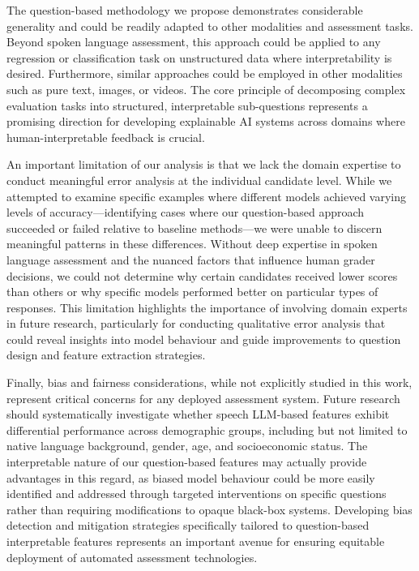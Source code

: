 \documentclass{report}
\begin{document}
The question-based methodology we propose demonstrates considerable generality and could be readily adapted to other modalities and assessment tasks. Beyond spoken language assessment, this approach could be applied to any regression or classification task on unstructured data where interpretability is desired. Furthermore, similar approaches could be employed in other modalities such as pure text, images, or videos. The core principle of decomposing complex evaluation tasks into structured, interpretable sub-questions represents a promising direction for developing explainable AI systems across domains where human-interpretable feedback is crucial.

An important limitation of our analysis is that we lack the domain expertise to conduct meaningful error analysis at the individual candidate level. While we attempted to examine specific examples where different models achieved varying levels of accuracy—identifying cases where our question-based approach succeeded or failed relative to baseline methods—we were unable to discern meaningful patterns in these differences. Without deep expertise in spoken language assessment and the nuanced factors that influence human grader decisions, we could not determine why certain candidates received lower scores than others or why specific models performed better on particular types of responses. This limitation highlights the importance of involving domain experts in future research, particularly for conducting qualitative error analysis that could reveal insights into model behaviour and guide improvements to question design and feature extraction strategies.

Finally, bias and fairness considerations, while not explicitly studied in this work, represent critical concerns for any deployed assessment system. Future research should systematically investigate whether speech LLM-based features exhibit differential performance across demographic groups, including but not limited to native language background, gender, age, and socioeconomic status. The interpretable nature of our question-based features may actually provide advantages in this regard, as biased model behaviour could be more easily identified and addressed through targeted interventions on specific questions rather than requiring modifications to opaque black-box systems. Developing bias detection and mitigation strategies specifically tailored to question-based interpretable features represents an important avenue for ensuring equitable deployment of automated assessment technologies.
\end{document}
